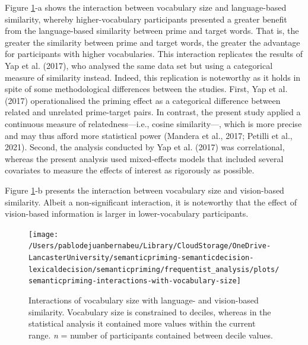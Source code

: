 \documentclass[
  12pt,
  man,floatsintext]{apa7}
\begin{document}
Figure \ref{fig:semanticpriming-interactions-with-vocabulary-size}-a shows the interaction between vocabulary size and language-based similarity, whereby higher-vocabulary participants presented a greater benefit from the language-based similarity between prime and target words. That is, the greater the similarity between prime and target words, the greater the advantage for participants with higher vocabularies. This interaction replicates the results of Yap et al. (2017), who analysed the same data set but using a categorical measure of similarity instead. Indeed, this replication is noteworthy as it holds in spite of some methodological differences between the studies. First, Yap et al. (2017) operationalised the priming effect as a categorical difference between related and unrelated prime-target pairs. In contrast, the present study applied a continuous measure of relatedness---i.e., cosine similarity---, which is more precise and may thus afford more statistical power (Mandera et al., 2017; Petilli et al., 2021). Second, the analysis conducted by Yap et al. (2017) was correlational, whereas the present analysis used mixed-effects models that included several covariates to measure the effects of interest as rigorously as possible.

Figure \ref{fig:semanticpriming-interactions-with-vocabulary-size}-b presents the interaction between vocabulary size and vision-based similarity. Albeit a non-significant interaction, it is noteworthy that the effect of vision-based information is larger in lower-vocabulary participants.



\begin{figure}

{\centering \texttt{[image: /Users/pablodejuanbernabeu/Library/CloudStorage/OneDrive-LancasterUniversity/semanticpriming-semanticdecision-lexicaldecision/semanticpriming/frequentist\_analysis/plots/semanticpriming-interactions-with-vocabulary-size]} 

}

\caption{Interactions of vocabulary size with language- and vision-based similarity. Vocabulary size is constrained to deciles, whereas in the statistical analysis it contained more values within the current range. \emph{n} = number of participants contained between decile values.}\label{fig:semanticpriming-interactions-with-vocabulary-size}
\end{figure}
\end{document}

